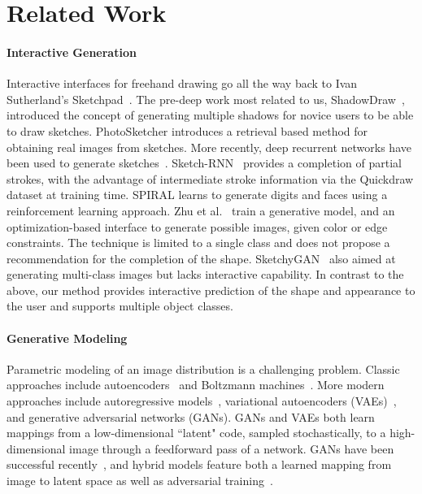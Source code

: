 \section{Related Work}

\paragraph{Interactive Generation} Interactive interfaces for freehand drawing go all the way back to Ivan Sutherland's Sketchpad~\cite{sutherland64}.  The pre-deep work most related to us, ShadowDraw~\cite{lee2011shadowdraw}, introduced the concept of generating multiple shadows for novice users to be able to draw sketches. PhotoSketcher \cite{eitz2011photosketcher} introduces a retrieval based method for obtaining real images from sketches. %
More recently, deep recurrent networks have been used to generate sketches~\cite{ha2017neural,ganin2018synthesizing}. Sketch-RNN~\cite{ha2017neural} provides a completion of partial strokes, with the advantage of intermediate stroke information via the Quickdraw dataset at training time. SPIRAL \cite{ganin2018synthesizing} learns to generate digits and faces using a reinforcement learning approach.
Zhu et al.~\cite{zhu2016generative} train a generative model, and an optimization-based interface to generate possible images, given color or edge constraints. The technique is limited to a single class and does not propose a recommendation for the completion of the shape. SketchyGAN~\cite{chen2018sketchygan} also aimed at generating multi-class images but lacks interactive capability. In contrast to the above, our method provides interactive prediction of the shape and appearance to the user and supports multiple object classes.
\vspace{-6mm}
\paragraph{Generative Modeling} Parametric modeling of an image distribution is a challenging problem. Classic approaches include autoencoders~\cite{hinton2006reducing,vincent2008extracting} and Boltzmann machines~\cite{smolensky1986information}. More modern approaches include autoregressive models~\cite{efros1999texture,van2016conditional}, variational autoencoders (VAEs)~\cite{kingma2013auto}, and generative adversarial networks (GANs). GANs and VAEs both learn mappings from a low-dimensional ``latent" code, sampled stochastically, to a high-dimensional image through a feedforward pass of a network. GANs have been successful recently~\cite{denton2015deep,radford2015unsupervised,arjovsky2017wgan}, and hybrid models feature both a learned mapping from image to latent space as well as adversarial training~\cite{donahue2016adversarial,dumoulin2016adversarially,larsen2016vaegan,chen2016infogan}.

